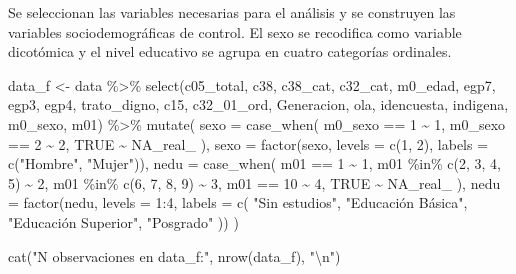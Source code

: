 \documentclass[
  spanish,
  a4paper,
  oneside]{scrbook}
\newenvironment{Shaded}{\begin{snugshade}}{\end{snugshade}}
\newcommand{\AttributeTok}[1]{\textcolor[rgb]{0.40,0.45,0.13}{#1}}
\newcommand{\ConstantTok}[1]{\textcolor[rgb]{0.56,0.35,0.01}{#1}}
\newcommand{\DecValTok}[1]{\textcolor[rgb]{0.68,0.00,0.00}{#1}}
\newcommand{\FunctionTok}[1]{\textcolor[rgb]{0.28,0.35,0.67}{#1}}
\newcommand{\NormalTok}[1]{\textcolor[rgb]{0.00,0.23,0.31}{#1}}
\newcommand{\OtherTok}[1]{\textcolor[rgb]{0.00,0.23,0.31}{#1}}
\newcommand{\SpecialCharTok}[1]{\textcolor[rgb]{0.37,0.37,0.37}{#1}}
\newcommand{\StringTok}[1]{\textcolor[rgb]{0.13,0.47,0.30}{#1}}
\begin{document}
Se seleccionan las variables necesarias para el análisis y se construyen
las variables sociodemográficas de control. El sexo se recodifica como
variable dicotómica y el nivel educativo se agrupa en cuatro categorías
ordinales.

\begin{Shaded}
\begin{Highlighting}[]
\NormalTok{data\_f }\OtherTok{\textless{}{-}}\NormalTok{ data }\SpecialCharTok{\%\textgreater{}\%}
  \FunctionTok{select}\NormalTok{(c05\_total, c38, c38\_cat, c32\_cat, m0\_edad, egp7, egp3, egp4,}
\NormalTok{         trato\_digno, c15, c32\_01\_ord, Generacion, ola, idencuesta,}
\NormalTok{         indigena, m0\_sexo, m01) }\SpecialCharTok{\%\textgreater{}\%}
  \FunctionTok{mutate}\NormalTok{(}
    \AttributeTok{sexo =} \FunctionTok{case\_when}\NormalTok{(}
\NormalTok{      m0\_sexo }\SpecialCharTok{==} \DecValTok{1} \SpecialCharTok{\textasciitilde{}} \DecValTok{1}\NormalTok{,}
\NormalTok{      m0\_sexo }\SpecialCharTok{==} \DecValTok{2} \SpecialCharTok{\textasciitilde{}} \DecValTok{2}\NormalTok{,}
      \ConstantTok{TRUE} \SpecialCharTok{\textasciitilde{}} \ConstantTok{NA\_real\_}
\NormalTok{    ),}
    \AttributeTok{sexo =} \FunctionTok{factor}\NormalTok{(sexo, }\AttributeTok{levels =} \FunctionTok{c}\NormalTok{(}\DecValTok{1}\NormalTok{, }\DecValTok{2}\NormalTok{), }\AttributeTok{labels =} \FunctionTok{c}\NormalTok{(}\StringTok{"Hombre"}\NormalTok{, }\StringTok{"Mujer"}\NormalTok{)),}
    \AttributeTok{nedu =} \FunctionTok{case\_when}\NormalTok{(}
\NormalTok{      m01 }\SpecialCharTok{==} \DecValTok{1}                \SpecialCharTok{\textasciitilde{}} \DecValTok{1}\NormalTok{,}
\NormalTok{      m01 }\SpecialCharTok{\%in\%} \FunctionTok{c}\NormalTok{(}\DecValTok{2}\NormalTok{, }\DecValTok{3}\NormalTok{, }\DecValTok{4}\NormalTok{, }\DecValTok{5}\NormalTok{) }\SpecialCharTok{\textasciitilde{}} \DecValTok{2}\NormalTok{,}
\NormalTok{      m01 }\SpecialCharTok{\%in\%} \FunctionTok{c}\NormalTok{(}\DecValTok{6}\NormalTok{, }\DecValTok{7}\NormalTok{, }\DecValTok{8}\NormalTok{, }\DecValTok{9}\NormalTok{) }\SpecialCharTok{\textasciitilde{}} \DecValTok{3}\NormalTok{,}
\NormalTok{      m01 }\SpecialCharTok{==} \DecValTok{10}               \SpecialCharTok{\textasciitilde{}} \DecValTok{4}\NormalTok{,}
      \ConstantTok{TRUE} \SpecialCharTok{\textasciitilde{}} \ConstantTok{NA\_real\_}
\NormalTok{    ),}
    \AttributeTok{nedu =} \FunctionTok{factor}\NormalTok{(nedu, }\AttributeTok{levels =} \DecValTok{1}\SpecialCharTok{:}\DecValTok{4}\NormalTok{, }\AttributeTok{labels =} \FunctionTok{c}\NormalTok{(}
      \StringTok{"Sin estudios"}\NormalTok{,}
      \StringTok{"Educación Básica"}\NormalTok{,}
      \StringTok{"Educación Superior"}\NormalTok{,}
      \StringTok{"Posgrado"}
\NormalTok{    ))}
\NormalTok{  )}

\FunctionTok{cat}\NormalTok{(}\StringTok{"N observaciones en data\_f:"}\NormalTok{, }\FunctionTok{nrow}\NormalTok{(data\_f), }\StringTok{"}\SpecialCharTok{\textbackslash{}n}\StringTok{"}\NormalTok{)}
\end{Highlighting}
\end{Shaded}
\end{document}
